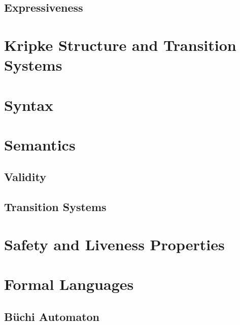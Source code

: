 \documentclass[a4paper, 11pt, accentcolor = tud3b]{tudreport}
\begin{document}
            \subsection{Expressiveness} %

        \section{Kripke Structure and Transition Systems} %

        \section{Syntax} %

        \section{Semantics} %

            \subsection{Validity} %

            \subsection{Transition Systems} %

        \section{Safety and Liveness Properties} %

        \section{Formal Languages} %

            \subsection{Büchi Automaton} %
\end{document}
